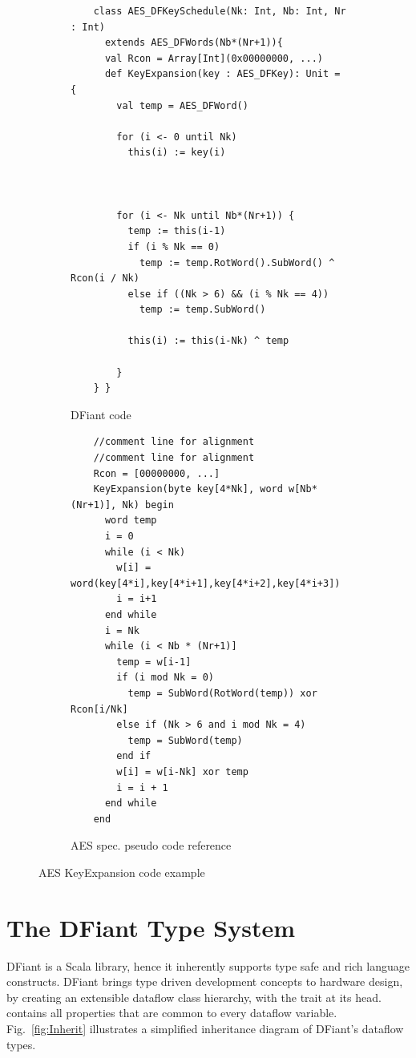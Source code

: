\begin{figure}[h]
  \centering
  \begin{subfigure}[b]{0.5\textwidth}
    \begin{verbatim}
    class AES_DFKeySchedule(Nk: Int, Nb: Int, Nr : Int) 
      extends AES_DFWords(Nb*(Nr+1)){
      val Rcon = Array[Int](0x00000000, ...)
      def KeyExpansion(key : AES_DFKey): Unit = {
        val temp = AES_DFWord()
      
        for (i <- 0 until Nk)
          this(i) := key(i)
      
      
      
        for (i <- Nk until Nb*(Nr+1)) {
          temp := this(i-1)
          if (i % Nk == 0)
            temp := temp.RotWord().SubWord() ^ Rcon(i / Nk)
          else if ((Nk > 6) && (i % Nk == 4))
            temp := temp.SubWord()
          
          this(i) := this(i-Nk) ^ temp
        
        }
    } }
    \end{verbatim}
    \caption{DFiant code}
  \end{subfigure}%
  \begin{subfigure}[b]{0.5\textwidth}
    \begin{verbatim}
    //comment line for alignment
    //comment line for alignment
    Rcon = [00000000, ...] 
    KeyExpansion(byte key[4*Nk], word w[Nb*(Nr+1)], Nk) begin
      word temp
      i = 0
      while (i < Nk)
        w[i] = word(key[4*i],key[4*i+1],key[4*i+2],key[4*i+3])
        i = i+1
      end while
      i = Nk
      while (i < Nb * (Nr+1)]
        temp = w[i-1]
        if (i mod Nk = 0)
          temp = SubWord(RotWord(temp)) xor Rcon[i/Nk]
        else if (Nk > 6 and i mod Nk = 4)
          temp = SubWord(temp)
        end if
        w[i] = w[i-Nk] xor temp
        i = i + 1
      end while
    end
    \end{verbatim}
    \caption{AES spec. pseudo code reference}
  \end{subfigure}
	\vspace*{-4ex}
  \caption{AES KeyExpansion code example}\label{fig:AES}
\end{figure}

\section{The DFiant Type System}
\label{sec:type_system}
DFiant is a Scala library, hence it inherently supports type safe and rich language constructs. DFiant brings type driven development concepts to hardware design, by creating an extensible dataflow class hierarchy, with the trait  at its head. 
 contains all properties that are common to every dataflow variable. 
Fig.~\ref{fig:Inherit} illustrates a simplified inheritance diagram of DFiant's dataflow types. 

